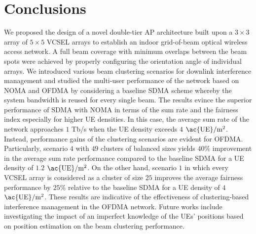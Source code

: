 \documentclass[lettersize,journal]{IEEEtran}
\begin{document}
\vspace{-10pt}

\section{Conclusions} \label{Conclusions}
We proposed the design of a novel double-tier \ac{AP} architecture built upon a $3\times3$ array of $5\times5$ \ac{VCSEL} arrays to establish an indoor grid-of-beam optical wireless access network. A full beam coverage with minimum overlaps between the beam spots were achieved by properly configuring the orientation angle of individual arrays. We introduced various beam clustering scenarios for downlink interference management and studied the multi-user performance of the network based on \ac{NOMA} and \ac{OFDMA} by considering a baseline \ac{SDMA} scheme whereby the system bandwidth is reused for every single beam. The results evince the superior performance of \ac{SDMA} with \ac{NOMA} in terms of the sum rate and the fairness index especially for higher \ac{UE} densities. In this case, the average sum rate of the network approaches $1$ Tb/s when the \ac{UE} density exceeds $4$ $\text{\ac{UE}}/\text{m}^2$. Instead, performance gains of the clustering scenarios are evident for \ac{OFDMA}. Particularly, scenario $4$ with $49$ clusters of balanced sizes yields $40\%$ improvement in the average sum rate performance compared to the baseline \ac{SDMA} for a \ac{UE} density of $1.2$ $\text{\ac{UE}}/\text{m}^2$. On the other hand, scenario $1$ in which every \ac{VCSEL} array is considered as a cluster of size $25$ improves the average fairness performance by $25\%$ relative to the baseline \ac{SDMA} for a \ac{UE} density of $4$ $\text{\ac{UE}}/\text{m}^2$. These results are indicative of the effectiveness of clustering-based interference management in the \ac{OFDMA} network. Future works include investigating the impact of an imperfect knowledge of the \acp{UE}' positions based on position estimation on the beam clustering performance.


\appendices
\end{document}
